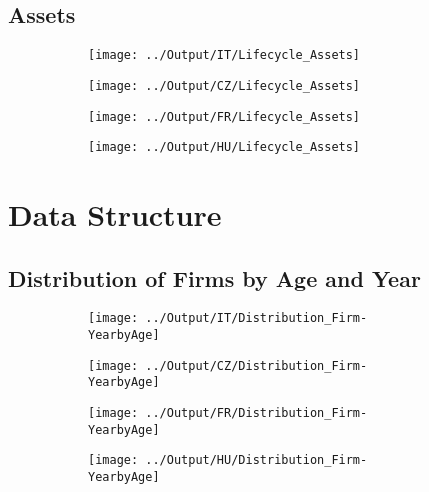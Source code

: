 \documentclass[12pt,notitlepage]{article}
\begin{document}
\subsection{Assets} %
\label{sec:assets}

\begin{figure}[!htpb]
\centering
\caption{Firm age and Assets}
\begin{subfigure}{.49\textwidth}
    \centering
 \texttt{[image: ../Output/IT/Lifecycle\_Assets]}
\end{subfigure}%
\begin{subfigure}{.49\textwidth}
    \centering
 \texttt{[image: ../Output/CZ/Lifecycle\_Assets]}
\end{subfigure}
\begin{subfigure}{.49\textwidth}
    \centering
 \texttt{[image: ../Output/FR/Lifecycle\_Assets]}
\end{subfigure}%
\begin{subfigure}{.49\textwidth}
    \centering
 \texttt{[image: ../Output/HU/Lifecycle\_Assets]}
\end{subfigure}
\end{figure}
\pagebreak






\FloatBarrier
\section{Data Structure} %
\label{sec:data_structure}
\FloatBarrier


\subsection{Distribution of Firms by Age and Year}
\begin{figure}[!htpb]
\centering
\caption{Firm age and Assets}
\begin{subfigure}{.49\textwidth}
    \centering
 \texttt{[image: ../Output/IT/Distribution\_Firm-YearbyAge]}
\end{subfigure}
\begin{subfigure}{.49\textwidth}
    \centering
 \texttt{[image: ../Output/CZ/Distribution\_Firm-YearbyAge]}
\end{subfigure}
\begin{subfigure}{.49\textwidth}
    \centering
 \texttt{[image: ../Output/FR/Distribution\_Firm-YearbyAge]}
\end{subfigure}%
\begin{subfigure}{.49\textwidth}
    \centering
 \texttt{[image: ../Output/HU/Distribution\_Firm-YearbyAge]}
\end{subfigure}
\end{figure}
\pagebreak
\end{document}
